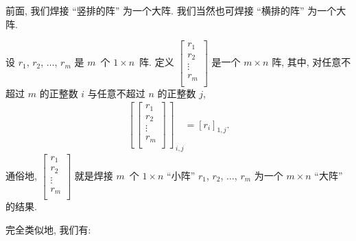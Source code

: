 \documentclass[%
    UTF8,%
    fontset=none,%
    punct=kaiming,%
    zihao=-4,%
    a4paper,%
    oneside,%
]{ctexbook}
\begin{document}
前面, 我们焊接 ``竖排的阵'' 为一个大阵.
我们当然也可焊接 ``横排的阵'' 为一个大阵.

\begin{definition}
    设 \(r_1\), \(r_2\), \(\dots\), \(r_m\)
    是 \(m\)~个 \(1 \times n\)~阵.
    定义
    \(
    \begin{bmatrix}
        r_1    \\
        r_2    \\
        \vdots \\
        r_m    \\
    \end{bmatrix}
    \)
    是一个 \(m \times n\) 阵,
    其中, 对任意不超过 \(m\) 的正整数 \(i\)
    与任意不超过 \(n\) 的正整数 \(j\),
    \begin{align*}
        \left[\,\begin{bmatrix}
                        r_1    \\
                        r_2    \\
                        \vdots \\
                        r_m    \\
                    \end{bmatrix}\,\right]_{\,i,j}
        = [r_i]_{1,j}.
    \end{align*}
    通俗地,
    \(
    \begin{bmatrix}
        r_1    \\
        r_2    \\
        \vdots \\
        r_m    \\
    \end{bmatrix}
    \)
    就是焊接 \(m\)~个 \(1 \times n\) ``小阵''
    \(r_1\), \(r_2\), \(\dots\), \(r_m\)
    为一个 \(m \times n\) ``大阵''
    的结果.
\end{definition}

完全类似地, 我们有:
\end{document}
